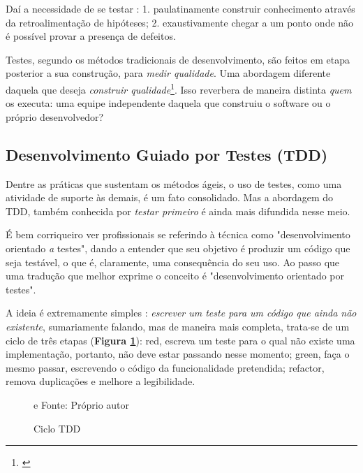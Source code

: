     Daí a necessidade de se testar \cite[pág. xxix-xxx]{Mezaros2007}: 1.
    paulatinamente construir conhecimento através da retroalimentação de
    hipóteses; 2. exaustivamente chegar a um ponto onde não é possível provar a
    presença de defeitos.

    Testes, segundo os métodos tradicionais de desenvolvimento, são feitos em
    etapa posterior a sua construção, para \emph{medir qualidade}. Uma abordagem
    diferente daquela que deseja \emph{construir qualidade}\footnote{
    \cite[pág. 7]{FarcicGarcia2015}}. Isso reverbera de maneira distinta
    \emph{quem} os executa: uma equipe independente daquela que construiu o
    software ou o próprio desenvolvedor?


    \subsection{Desenvolvimento Guiado por Testes (TDD)}

      Dentre as práticas que sustentam os métodos ágeis, o uso de testes, como
      uma atividade de suporte às demais, é um fato consolidado. Mas a abordagem
      do TDD, também conhecida por \emph{testar primeiro} é ainda mais difundida
      nesse  meio.

      É bem corriqueiro ver profissionais se referindo à  técnica como
      "desenvolvimento orientado \emph{a} testes", dando a entender que seu
      objetivo é produzir um código que seja testável, o que é, claramente, uma
      consequência do seu uso. Ao passo que uma tradução que melhor exprime o
      conceito é "desenvolvimento orientado {por} testes".

      A ideia é extremamente simples \cite[p.1]{FreemanPryce2009}: \emph{escrever um
      teste para um código que ainda não existente}, sumariamente falando, mas
      de maneira mais completa, trata-se de um ciclo de três etapas\cite[pág. x]
      {Beck2003} (\textbf{Figura \ref{fig:ciclo-tdd}}): red,  escreva um teste
      para o qual não existe uma implementação, portanto, não deve estar
      passando nesse momento; green, faça o mesmo passar, escrevendo o código da
      funcionalidade pretendida; refactor, remova duplicações e melhore a
      legibilidade.

      \begin{figure}[h!]
        \centering
        \caption{Ciclo TDD}
e       
        Fonte: Próprio autor\footnotemark
        \label{fig:ciclo-tdd}
      \end{figure}

